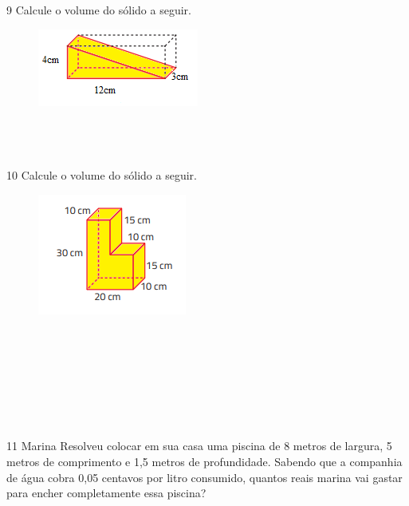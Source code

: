 \num{9} Calcule o volume do sólido a seguir.
\begin{figure}[H]
\centering\includegraphics[width=2.08333in,height=1in]{./imgSAEB_8_MAT/media/image52.png}
\end{figure}

\\
\\
\\

\num{10} Calcule o volume do sólido a seguir.
\begin{figure}[H]
\centering\includegraphics[width=1.92708in,height=1.5625in]{./imgSAEB_8_MAT/media/image53.png}
\end{figure}

\\
\\
\\

\\
\\
\\

\\

\num{11} Marina Resolveu colocar em sua casa uma piscina de 8 metros de
largura, 5 metros de comprimento e 1,5 metros de profundidade. Sabendo
que a companhia de água cobra 0,05 centavos por litro consumido, quantos
reais marina vai gastar para encher completamente essa piscina?


